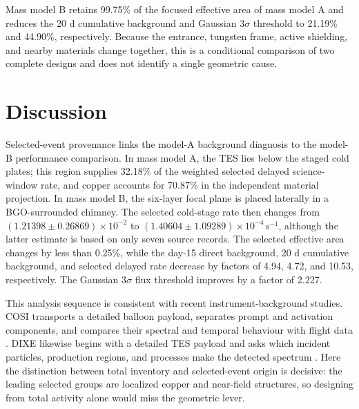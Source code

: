 \documentclass[11pt]{article}
\newcommand{\cps}{\ensuremath{\,\mathrm{s^{-1}}}}
\begin{document}
Mass model B retains 99.75\% of the focused effective area of mass model A and reduces the 20 d cumulative background and Gaussian $3\sigma$ threshold to 21.19\% and 44.90\%, respectively. Because the entrance, tungsten frame, active shielding, and nearby materials change together, this is a conditional comparison of two complete designs and does not identify a single geometric cause.

\FloatBarrier

\section{Discussion}
\label{sec:discussion}

Selected-event provenance links the model-A background diagnosis to the
model-B performance comparison. In mass model A, the TES lies below the staged cold
plates; this region supplies 32.18\% of the weighted selected delayed science-window
rate, and copper accounts for 70.87\% in the independent material projection. In
mass model B, the six-layer focal plane is placed laterally in a BGO-surrounded
chimney. The selected cold-stage rate then changes from
$(1.21398\pm0.26869)\times10^{-2}$ to
$(1.40604\pm1.09289)\times10^{-4}\cps$, although the latter estimate is based on
only seven source records. The selected effective area changes by less than
0.25\%, while the day-15 direct background, 20 d cumulative background, and
selected delayed rate decrease by factors of 4.94, 4.72, and 10.53,
respectively. The Gaussian $3\sigma$ flux threshold improves by a factor of
2.227.

This analysis sequence is consistent with recent instrument-background studies.
COSI transports a detailed balloon payload, separates prompt and activation
components, and compares their spectral and temporal behaviour with flight data
\cite{Gallego2025Balloon}. DIXE likewise begins with a detailed TES payload and
asks which incident particles, production regions, and processes make the
detected spectrum \cite{Tian2026DIXE}. Here the distinction between total
inventory and selected-event origin is decisive: the leading selected groups are
localized copper and near-field structures, so designing from total activity
alone would miss the geometric lever.
\end{document}
